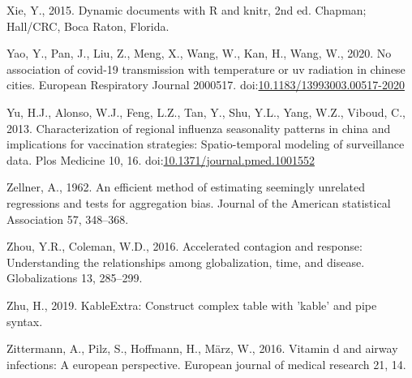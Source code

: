 \documentclass[]{elsarticle} %
\begin{document}
\leavevmode\hypertarget{ref-Xie2015}{}%
Xie, Y., 2015. Dynamic documents with R and knitr, 2nd ed. Chapman;
Hall/CRC, Boca Raton, Florida.

\leavevmode\hypertarget{ref-Yao2020association}{}%
Yao, Y., Pan, J., Liu, Z., Meng, X., Wang, W., Kan, H., Wang, W., 2020.
No association of covid-19 transmission with temperature or uv radiation
in chinese cities. European Respiratory Journal 2000517.
doi:\href{https://doi.org/10.1183/13993003.00517-2020}{10.1183/13993003.00517-2020}

\leavevmode\hypertarget{ref-Yu2013characterization}{}%
Yu, H.J., Alonso, W.J., Feng, L.Z., Tan, Y., Shu, Y.L., Yang, W.Z.,
Viboud, C., 2013. Characterization of regional influenza seasonality
patterns in china and implications for vaccination strategies:
Spatio-temporal modeling of surveillance data. Plos Medicine 10, 16.
doi:\href{https://doi.org/10.1371/journal.pmed.1001552}{10.1371/journal.pmed.1001552}

\leavevmode\hypertarget{ref-Zellner1962efficient}{}%
Zellner, A., 1962. An efficient method of estimating seemingly unrelated
regressions and tests for aggregation bias. Journal of the American
statistical Association 57, 348--368.

\leavevmode\hypertarget{ref-Zhou2016accelerated}{}%
Zhou, Y.R., Coleman, W.D., 2016. Accelerated contagion and response:
Understanding the relationships among globalization, time, and disease.
Globalizations 13, 285--299.

\leavevmode\hypertarget{ref-Zhu2019}{}%
Zhu, H., 2019. KableExtra: Construct complex table with 'kable' and pipe
syntax.

\leavevmode\hypertarget{ref-Zittermann2016vitamin}{}%
Zittermann, A., Pilz, S., Hoffmann, H., März, W., 2016. Vitamin d and
airway infections: A european perspective. European journal of medical
research 21, 14.
\end{document}
